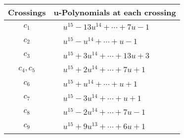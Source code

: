 \documentclass[1p]{elsarticle_modified}
\theoremstyle{definition}
\begin{document}
\begin{tabular}{m{50pt}|m{274pt}}
Crossings & \hspace{64pt}u-Polynomials at each crossing \\
\hline $$\begin{aligned}c_{1}\end{aligned}$$&$\begin{aligned}
&u^{15}-13 u^{14}+\cdots+7 u-1
\end{aligned}$\\
\hline $$\begin{aligned}c_{2}\end{aligned}$$&$\begin{aligned}
&u^{15}- u^{14}+\cdots+u-1
\end{aligned}$\\
\hline $$\begin{aligned}c_{3}\end{aligned}$$&$\begin{aligned}
&u^{15}+3 u^{14}+\cdots+13 u+3
\end{aligned}$\\
\hline $$\begin{aligned}c_{4},c_{5}\end{aligned}$$&$\begin{aligned}
&u^{15}+2 u^{14}+\cdots+7 u+1
\end{aligned}$\\
\hline $$\begin{aligned}c_{6}\end{aligned}$$&$\begin{aligned}
&u^{15}+u^{14}+\cdots+u+1
\end{aligned}$\\
\hline $$\begin{aligned}c_{7}\end{aligned}$$&$\begin{aligned}
&u^{15}-3 u^{14}+\cdots+u+1
\end{aligned}$\\
\hline $$\begin{aligned}c_{8}\end{aligned}$$&$\begin{aligned}
&u^{15}-2 u^{14}+\cdots+7 u-1
\end{aligned}$\\
\hline $$\begin{aligned}c_{9}\end{aligned}$$&$\begin{aligned}
&u^{15}+9 u^{13}+\cdots+6 u+1
\end{aligned}$\\

\end{tabular}
\end{document}
